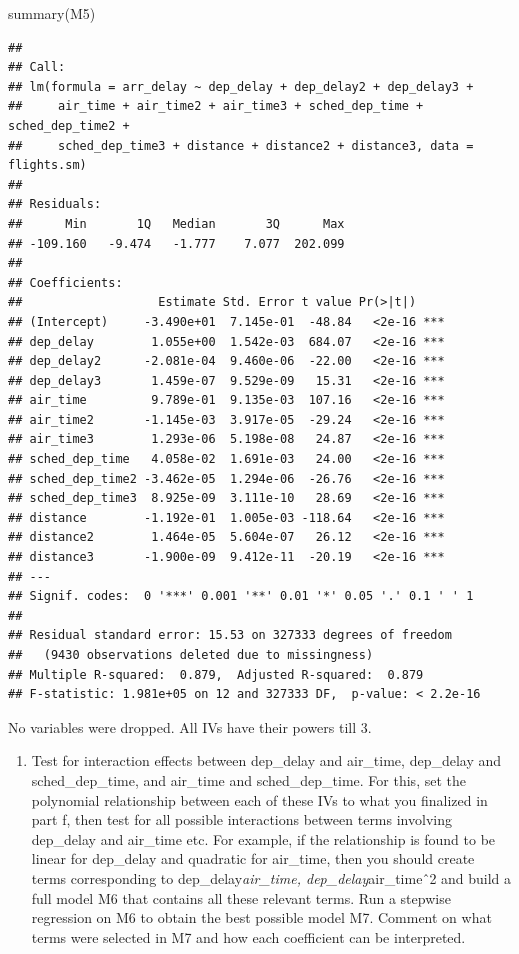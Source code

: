 \documentclass[
]{article}
\newenvironment{Shaded}{\begin{snugshade}}{\end{snugshade}}
\newcommand{\FunctionTok}[1]{\textcolor[rgb]{0.00,0.00,0.00}{#1}}
\newcommand{\NormalTok}[1]{#1}
\providecommand{\tightlist}{%
  \setlength{\itemsep}{0pt}\setlength{\parskip}{0pt}}
\begin{document}
\begin{Shaded}
\begin{Highlighting}[]
\FunctionTok{summary}\NormalTok{(M5)}
\end{Highlighting}
\end{Shaded}

\begin{verbatim}
## 
## Call:
## lm(formula = arr_delay ~ dep_delay + dep_delay2 + dep_delay3 + 
##     air_time + air_time2 + air_time3 + sched_dep_time + sched_dep_time2 + 
##     sched_dep_time3 + distance + distance2 + distance3, data = flights.sm)
## 
## Residuals:
##      Min       1Q   Median       3Q      Max 
## -109.160   -9.474   -1.777    7.077  202.099 
## 
## Coefficients:
##                   Estimate Std. Error t value Pr(>|t|)    
## (Intercept)     -3.490e+01  7.145e-01  -48.84   <2e-16 ***
## dep_delay        1.055e+00  1.542e-03  684.07   <2e-16 ***
## dep_delay2      -2.081e-04  9.460e-06  -22.00   <2e-16 ***
## dep_delay3       1.459e-07  9.529e-09   15.31   <2e-16 ***
## air_time         9.789e-01  9.135e-03  107.16   <2e-16 ***
## air_time2       -1.145e-03  3.917e-05  -29.24   <2e-16 ***
## air_time3        1.293e-06  5.198e-08   24.87   <2e-16 ***
## sched_dep_time   4.058e-02  1.691e-03   24.00   <2e-16 ***
## sched_dep_time2 -3.462e-05  1.294e-06  -26.76   <2e-16 ***
## sched_dep_time3  8.925e-09  3.111e-10   28.69   <2e-16 ***
## distance        -1.192e-01  1.005e-03 -118.64   <2e-16 ***
## distance2        1.464e-05  5.604e-07   26.12   <2e-16 ***
## distance3       -1.900e-09  9.412e-11  -20.19   <2e-16 ***
## ---
## Signif. codes:  0 '***' 0.001 '**' 0.01 '*' 0.05 '.' 0.1 ' ' 1
## 
## Residual standard error: 15.53 on 327333 degrees of freedom
##   (9430 observations deleted due to missingness)
## Multiple R-squared:  0.879,  Adjusted R-squared:  0.879 
## F-statistic: 1.981e+05 on 12 and 327333 DF,  p-value: < 2.2e-16
\end{verbatim}

No variables were dropped. All IVs have their powers till 3.

\begin{enumerate}
\def\labelenumi{\alph{enumi}.}
\setcounter{enumi}{6}
\tightlist
\item
  Test for interaction effects between dep\_delay and air\_time,
  dep\_delay and sched\_dep\_time, and air\_time and sched\_dep\_time.
  For this, set the polynomial relationship between each of these IVs to
  what you finalized in part f, then test for all possible interactions
  between terms involving dep\_delay and air\_time etc. For example, if
  the relationship is found to be linear for dep\_delay and quadratic
  for air\_time, then you should create terms corresponding to
  dep\_delay\emph{air\_time, dep\_delay}air\_timeˆ2 and build a full
  model M6 that contains all these relevant terms. Run a stepwise
  regression on M6 to obtain the best possible model M7. Comment on what
  terms were selected in M7 and how each coefficient can be interpreted.
\end{enumerate}
\end{document}
